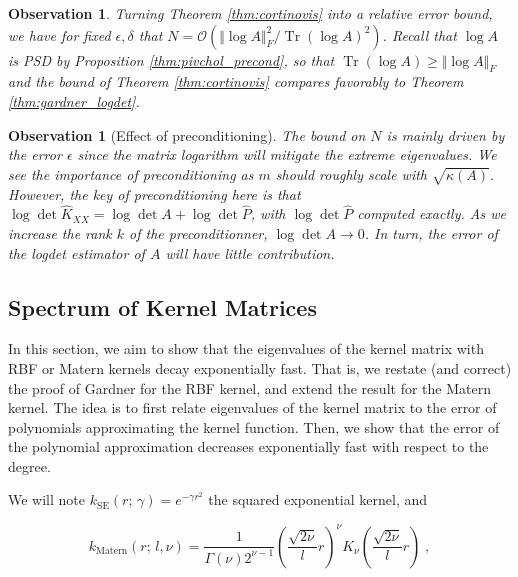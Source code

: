 \documentclass{article}
\newcommand{\norm}[1]{\Vert #1 \Vert}
\DeclareMathOperator{\trace}{Tr}
\newtheorem{observation}[theorem]{Observation}
\begin{document}
\begin{observation}
Turning Theorem \ref{thm:cortinovis} into a relative error bound, we have for fixed $\epsilon, \delta$ that $N = \mathcal O(\norm{\log A}_F^2 / \trace(\log A)^2)$. Recall that $\log A$ is PSD by Proposition \ref{thm:pivchol_precond}, so that $\trace(\log A) \ge \norm{\log A}_F$ and the bound of Theorem \ref{thm:cortinovis} compares favorably to Theorem \ref{thm:gardner_logdet}.
\end{observation}

\begin{observation}[Effect of preconditioning]
The bound on $N$ is mainly driven by the error $\epsilon$ since the matrix logarithm will mitigate the extreme eigenvalues. We see the importance of preconditioning as $m$ should roughly scale with $\sqrt{\kappa(A)}$. 
However, the key of preconditioning here is that $\log\det \widehat K_{XX} = \log\det A + \log\det \widehat P$, with $\log\det \widehat P$ computed exactly. As we increase the rank $k$ of the preconditionner, $\log\det A \to 0$. In turn, the error of the logdet estimator of $A$ will have little contribution.

\end{observation}

\subsection{Spectrum of Kernel Matrices}

In this section, we aim to show that the eigenvalues of the kernel matrix with RBF or Matern kernels decay exponentially fast. That is, we restate (and correct) the proof of Gardner for the RBF kernel, and extend the result for the Matern kernel. The idea is to first relate eigenvalues of the kernel matrix to the error of polynomials approximating the kernel function. Then, we show that the error of the polynomial approximation decreases exponentially fast with respect to the degree.

We will note $k_{\text{SE}}(r; \, \gamma) = e^{-\gamma r^2}$ the squared exponential kernel, and 

\begin{equation*}
    k_{\text{Matern}}(r ; \, l, \nu) = \frac{1}{\Gamma(\nu) 2^{\nu - 1}} \left( \frac{\sqrt{2\nu}}{l} r \right)^\nu K_\nu \left( \frac{\sqrt{2\nu}}{l} r \right) \; ,
\end{equation*}
\end{document}
